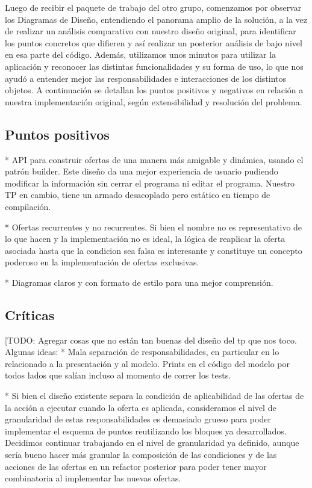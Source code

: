 \documentclass[a4paper,11pt]{article}
\begin{document}
Luego de recibir el paquete de trabajo del otro grupo, comenzamos por observar 
los Diagramas de Diseño, entendiendo el panorama amplio de la solución, a
la vez de realizar un análisis comparativo con nuestro diseño original, 
para identificar los puntos concretos que difieren y así realizar un posterior 
análisis de bajo nivel en esa parte del código.
Además, utilizamos unos minutos para utilizar la aplicación y reconocer las 
distintas funcionalidades y su forma de uso, lo que nos ayudó a entender mejor 
las responsabilidades e interacciones de los distintos objetos.
A continuación se detallan los puntos positivos y negativos en 
relación a nuestra implementación original, según extensibilidad y resolución 
del problema.

\subsection{Puntos positivos}

  * API para construir ofertas de una manera más amigable y dinámica, usando el patrón
  builder. Este diseño da una mejor experiencia de usuario pudiendo modificar la 
  información sin cerrar el programa ni editar el programa. Nuestro TP en cambio, 
  tiene un armado desacoplado pero estático en tiempo de compilación.

  * Ofertas recurrentes y no recurrentes. Si bien el nombre no es
  representativo de lo que hacen y la implementación no es ideal, la lógica
  de reaplicar la oferta asociada hasta que la condicion sea falsa es interesante
  y constituye un concepto poderoso en la implementación de ofertas exclusivas.
  
  * Diagramas claros y con formato de estilo para una mejor comprensión.

\subsection{Críticas}

[TODO: Agregar cosas que no están tan buenas del diseño del tp que nos toco. Algunas ideas:
  * Mala separación de responsabilidades, en particular en lo relacionado a
  la presentación y al modelo. Prints en el código del modelo por todos
  lados que salían incluso al momento de correr los tests.

  * Si bien el diseño existente separa la condición de aplicabilidad de las
  ofertas de la acción a ejecutar cuando la oferta es aplicada,
  consideramos el nivel de granularidad de estas responsabilidades es demasiado
  grueso para poder implementar el esquema de puntos reutilizando los bloques ya
  desarrollados. Decidimos continuar trabajando en el nivel de granularidad ya
  definido, aunque sería bueno hacer más granular la composición de las
  condiciones y de las acciones de las ofertas en un refactor posterior para
  poder tener mayor combinatoria al implementar las nuevas ofertas.
\end{document}
